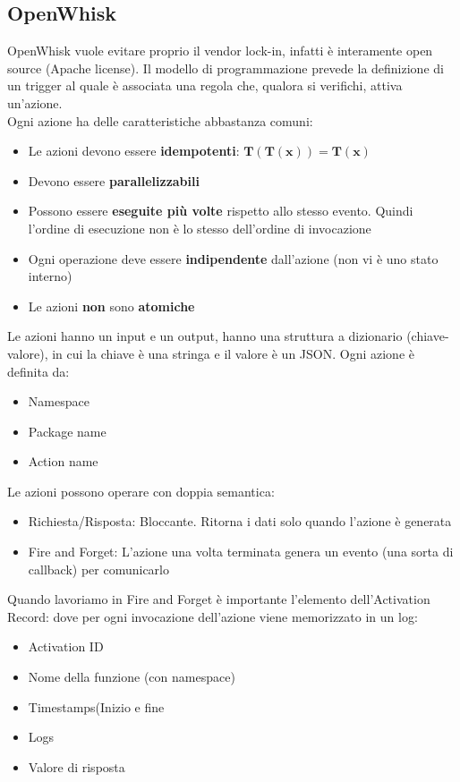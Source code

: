 \documentclass{article}
\begin{document}
		\subsection{OpenWhisk}
		OpenWhisk vuole evitare proprio il vendor lock-in, infatti è interamente open source (Apache license). Il modello di programmazione prevede la definizione di un trigger al quale è associata una regola che, qualora si verifichi, attiva un’azione.\\
		Ogni azione ha delle caratteristiche abbastanza comuni:
		\begin{itemize}
		    \item Le azioni devono essere \textbf{idempotenti}: $\mathbf{T(T(x)) = T(x)}$
		    \item Devono essere \textbf{parallelizzabili}
		    \item Possono essere \textbf{eseguite più volte} rispetto allo stesso evento. Quindi l'ordine di esecuzione non è lo stesso dell'ordine di invocazione
		    \item Ogni operazione deve essere \textbf{indipendente} dall'azione (non vi è uno stato interno)
		    \item Le azioni \textbf{non} sono \textbf{atomiche}
		\end{itemize}
		Le azioni hanno un input e un output, hanno una struttura a dizionario (chiave-valore), in cui la chiave è una stringa e il valore è un JSON. Ogni azione è definita da:
		\begin{itemize}
		    \item Namespace
		    \item Package name
		    \item Action name
		\end{itemize}
		Le azioni possono operare con doppia semantica:
		\begin{itemize}
		    \item Richiesta/Risposta: Bloccante. Ritorna i dati solo quando l'azione è generata
		    \item Fire and Forget: L'azione una volta terminata genera un evento (una sorta di callback) per comunicarlo 
		\end{itemize}
		Quando lavoriamo in Fire and Forget è importante l'elemento dell'Activation Record: dove per ogni invocazione dell'azione viene memorizzato in un log:
		\begin{itemize}
		    \item Activation ID
		    \item Nome della funzione (con namespace)
		    \item Timestamps(Inizio e fine
		    \item Logs
		    \item Valore di risposta
		\end{itemize}
\end{document}
